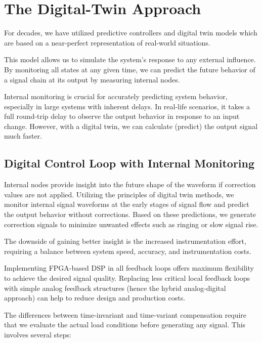 
\section{The Digital-Twin Approach}
\label{sec:digital-twin-approach}

For decades, we have utilized predictive controllers \autocite{holtzj}
and digital twin models \autocite{aivaliotis} which are based on a near-perfect
representation of real-world situations.

This model allows us to simulate the system's response to any external
influence.
By monitoring all states at any given time, we can predict the future behavior
of a signal chain at its output by measuring internal nodes.

Internal monitoring is crucial for accurately predicting system behavior,
especially in large systems with inherent delays.
In real-life scenarios, it takes a full round-trip delay to observe the output
behavior in response to an input change.
However, with a digital twin, we can calculate (predict) the output signal
much faster.

\subsection{Digital Control Loop with Internal Monitoring}
\label{subsec:digital-control-with-internal-monitoring}

Internal nodes provide insight into the future shape of the waveform if
correction values are not applied.
Utilizing the principles of digital twin methods, we monitor internal signal
waveforms at the early stages of signal flow and predict the output behavior
without corrections.
Based on these predictions, we generate correction signals to minimize unwanted
effects such as ringing or slow signal rise.

The downside of gaining better insight is the increased instrumentation effort,
requiring a balance between system speed, accuracy, and instrumentation costs.

Implementing \acs{FPGA}-based \acs{DSP} in all feedback loops offers maximum
flexibility to achieve the desired signal quality.
Replacing less critical local feedback loops with simple analog feedback
structures (hence the hybrid analog-digital approach) can help to reduce design
and production costs.

The differences between time-invariant and time-variant compensation require
that we evaluate the actual load conditions before generating any signal.
This involves several steps:

